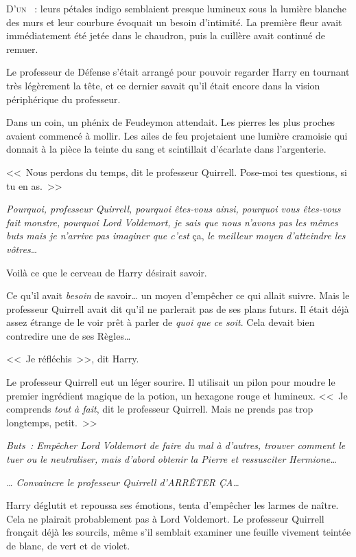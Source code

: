 
\lettrine{D}{'un} ~: leurs pétales indigo semblaient presque lumineux sous la lumière blanche des murs et leur courbure évoquait un besoin d'intimité. La première fleur avait immédiatement été jetée dans le chaudron, puis la cuillère avait continué de remuer.

Le professeur de Défense s'était arrangé pour pouvoir regarder Harry en tournant très légèrement la tête, et ce dernier savait qu'il était encore dans la vision périphérique du professeur.

Dans un coin, un phénix de Feudeymon attendait. Les pierres les plus proches avaient commencé à mollir. Les ailes de feu projetaient une lumière cramoisie qui donnait à la pièce la teinte du sang et scintillait d'écarlate dans l'argenterie.

<<~Nous perdons du temps, dit le professeur Quirrell. Pose-moi tes questions, si tu en as.~>>

\emph{Pourquoi, professeur Quirrell, pourquoi êtes-vous ainsi, pourquoi vous êtes-vous fait monstre, pourquoi Lord Voldemort, je sais que nous n'avons pas les mêmes buts mais je n'arrive pas imaginer que c'est} ça, \emph{le meilleur moyen d'atteindre les vôtres…}

Voilà ce que le cerveau de Harry désirait savoir.

Ce qu'il avait \emph{besoin} de savoir… un moyen d'empêcher ce qui allait suivre. Mais le professeur Quirrell avait dit qu'il ne parlerait pas de ses plans futurs. Il était déjà assez étrange de le voir prêt à parler de \emph{quoi que ce soit}. Cela devait bien contredire une de ses Règles…

<<~Je réfléchis~>>, dit Harry.

Le professeur Quirrell eut un léger sourire. Il utilisait un pilon pour moudre le premier ingrédient magique de la potion, un hexagone rouge et lumineux. <<~Je comprends \emph{tout à fait}, dit le professeur Quirrell. Mais ne prends pas trop longtemps, petit.~>>

\emph{Buts~: Empêcher Lord Voldemort de faire du mal à d'autres, trouver comment le tuer ou le neutraliser, mais d'abord obtenir la Pierre et ressusciter Hermione…}

\emph{… Convaincre le professeur Quirrell d'ARRÊTER ÇA…}

Harry déglutit et repoussa ses émotions, tenta d'empêcher les larmes de naître. Cela ne plairait probablement pas à Lord Voldemort. Le professeur Quirrell fronçait déjà les sourcils, même s'il semblait examiner une feuille vivement teintée de blanc, de vert et de violet.

